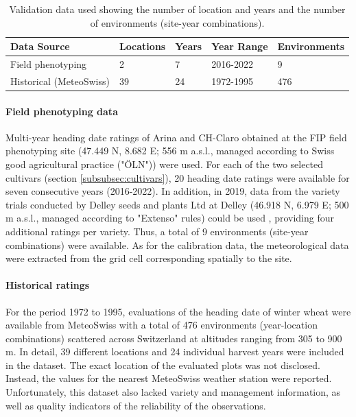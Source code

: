 \begin{table}[H]
\caption{Validation data used showing the number of location and years and the number of environments (site-year combinations).}
\centering
\label{tab:val-data}
\begin{tabular}{@{}lllll@{}}
\toprule
\textbf{Data Source}  & \textbf{Locations} & \textbf{Years} & \textbf{Year Range} & \textbf{Environments}   \\ \midrule
Field phenotyping    & 2        & 7    & 2016-2022 & 9 \\
Historical (MeteoSwiss) & 39        & 24    & 1972-1995  & 476  \\ \bottomrule
\end{tabular}
\end{table}

\paragraph{Field phenotyping data}
Multi-year heading date ratings of Arina and CH-Claro obtained at the FIP field phenotyping site \citep{kirchgessner_eth_2017} (47.449 N, 8.682 E; 556 m a.s.l., managed according to Swiss good agricultural practice ("ÖLN")) were used. For each of the two selected cultivars (section \ref{subsubsec:cultivars}), 20 heading date ratings were available for seven consecutive years (2016-2022). In addition, in 2019, data from the variety trials conducted by Delley seeds and plants Ltd at Delley (46.918 N, 6.979 E; 500 m a.s.l., managed according to "Extenso" rules) could be used \citep{roth_image-based_2023}, providing four additional ratings per variety. Thus, a total of 9 environments (site-year combinations) were available. As for the calibration data, the meteorological data were extracted from the grid cell corresponding spatially to the site.

\paragraph{Historical ratings}
For the period 1972 to 1995, evaluations of the heading date of winter wheat were available from MeteoSwiss with a total of 476 environments (year-location combinations) scattered across Switzerland at altitudes ranging from 305 to 900 m. In detail, 39 different locations and 24 individual harvest years were included in the dataset. The exact location of the evaluated plots was not disclosed. Instead, the values for the nearest MeteoSwiss weather station were reported. Unfortunately, this dataset also lacked variety and management information, as well as quality indicators of the reliability of the observations.

